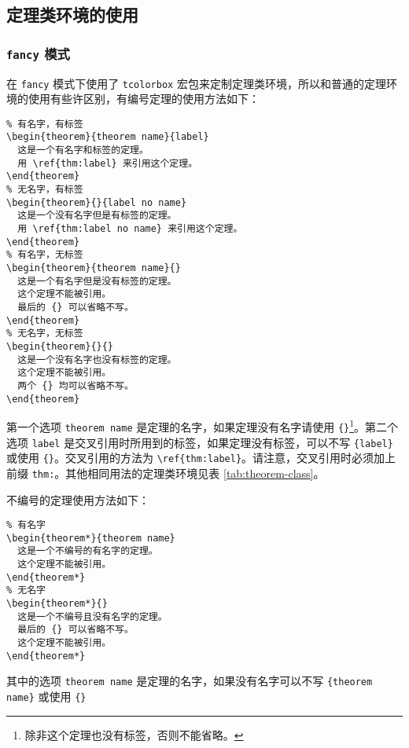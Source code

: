 \documentclass[lang=cn,newtx,10pt,scheme=chinese,color=black]{elegantbook}
\begin{document}
\subsection{定理类环境的使用}

\subsubsection{\texttt{fancy} 模式}

在 \lstinline{fancy} 模式下使用了 \lstinline{tcolorbox} 宏包来定制定理类环境，所以和普通的定理环境的使用有些许区别，有编号定理的使用方法如下：

\begin{lstlisting}
% 有名字，有标签
\begin{theorem}{theorem name}{label}
  这是一个有名字和标签的定理。
  用 \ref{thm:label} 来引用这个定理。
\end{theorem}
% 无名字，有标签
\begin{theorem}{}{label no name}
  这是一个没有名字但是有标签的定理。
  用 \ref{thm:label no name} 来引用这个定理。
\end{theorem}
% 有名字，无标签
\begin{theorem}{theorem name}{}
  这是一个有名字但是没有标签的定理。
  这个定理不能被引用。
  最后的 {} 可以省略不写。
\end{theorem}
% 无名字，无标签
\begin{theorem}{}{}
  这是一个没有名字也没有标签的定理。
  这个定理不能被引用。
  两个 {} 均可以省略不写。
\end{theorem}
\end{lstlisting}

第一个选项 \lstinline{theorem name} 是定理的名字，如果定理没有名字请使用 \lstinline|{}|\cprotect\footnote{除非这个定理也没有标签，否则不能省略。}。第二个选项 \lstinline{label} 是交叉引用时所用到的标签，如果定理没有标签，可以不写 \lstinline|{label}| 或使用 \lstinline|{}|。交叉引用的方法为 \lstinline|\ref{thm:label}|。请注意，交叉引用时必须加上前缀 \lstinline{thm:}。其他相同用法的定理类环境见表 \ref{tab:theorem-class}。

不编号的定理使用方法如下：

\begin{lstlisting}
% 有名字
\begin{theorem*}{theorem name}
  这是一个不编号的有名字的定理。
  这个定理不能被引用。
\end{theorem*}
% 无名字
\begin{theorem*}{}
  这是一个不编号且没有名字的定理。
  最后的 {} 可以省略不写。
  这个定理不能被引用。
\end{theorem*}
\end{lstlisting}
其中的选项 \lstinline{theorem name} 是定理的名字，如果没有名字可以不写 \lstinline|{theorem name}| 或使用 \lstinline|{}|
\end{document}
